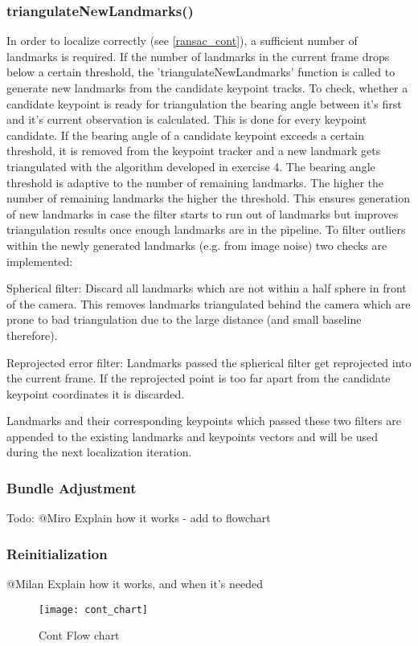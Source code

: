\subsubsection{triangulateNewLandmarks()} \label{triang_cont}
In order to localize correctly (see \cref{ransac_cont}), a sufficient number of landmarks is required. If the number of landmarks in the current frame drops below a certain threshold, the 'triangulateNewLandmarks' function is called to generate new landmarks from the candidate keypoint tracks. To check, whether a candidate keypoint is ready for triangulation the bearing angle between it's first and it's current observation is calculated. This is done for every keypoint candidate. If the bearing angle of a candidate keypoint exceeds a certain threshold, it is removed from the keypoint tracker and a new landmark gets triangulated with the algorithm developed in exercise 4. The bearing angle threshold is adaptive to the number of remaining landmarks. The higher the number of remaining landmarks the higher the threshold. This ensures generation of new landmarks in case the filter starts to run out of landmarks but improves triangulation results once enough landmarks are in the pipeline.
To filter outliers within the newly generated landmarks (e.g. from image noise) two checks are implemented:
\begin{compactenum}
	\item Spherical filter: Discard all landmarks which are not within a half sphere in front of the camera. This removes landmarks triangulated behind the camera which are prone to bad triangulation due to the large distance (and small baseline therefore).
	\item Reprojected error filter: Landmarks passed the spherical filter get reprojected into the current frame. If the reprojected point is too far apart from the candidate keypoint coordinates it is discarded.
\end{compactenum}
Landmarks and their corresponding keypoints which passed these two filters are appended to the existing landmarks and keypoints vectors and will be used during the next localization iteration.

\subsubsection{Bundle Adjustment}
Todo: @Miro
Explain how it works - add to flowchart

\subsubsection{Reinitialization}
@Milan
Explain how it works, and when it's needed

\begin{figure}[ht]
	\centering
	\texttt{[image: cont\_chart]}
	\caption{Cont Flow chart}
	\label{img_flow_cont}
\end{figure}